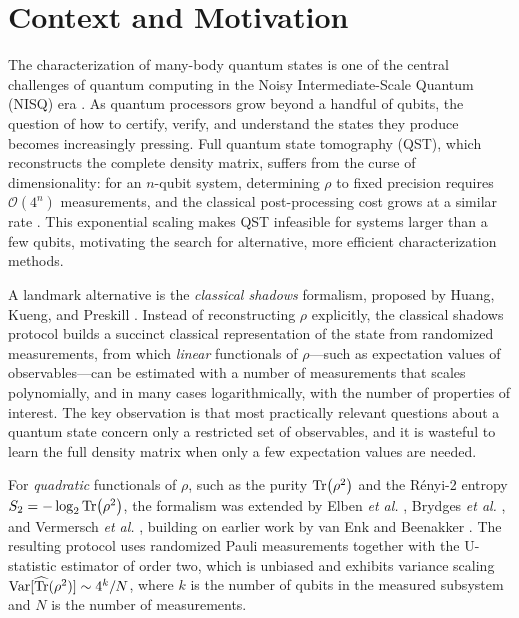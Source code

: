 \documentclass[12pt,a4paper,oneside]{book}
\theoremstyle{plain}
\theoremstyle{definition}
\theoremstyle{remark}
\DeclareMathOperator{\Var}{Var}
\begin{document}
\section{Context and Motivation}
\label{sec:context}

The characterization of many-body quantum states is one of the central challenges of quantum computing in the Noisy Intermediate-Scale Quantum (NISQ) era \cite{preskill2018quantum}. As quantum processors grow beyond a handful of qubits, the question of how to certify, verify, and understand the states they produce becomes increasingly pressing. Full quantum state tomography (QST), which reconstructs the complete density matrix, suffers from the curse of dimensionality: for an $n$-qubit system, determining $\rho$ to fixed precision requires $\mathcal{O}(4^n)$ measurements, and the classical post-processing cost grows at a similar rate \cite{gross2010compressed, nielsen2010quantum}. This exponential scaling makes QST infeasible for systems larger than a few qubits, motivating the search for alternative, more efficient characterization methods.

A landmark alternative is the \emph{classical shadows} formalism, proposed by Huang, Kueng, and Preskill \cite{huang2020predicting}. Instead of reconstructing $\rho$ explicitly, the classical shadows protocol builds a succinct classical representation of the state from randomized measurements, from which \emph{linear} functionals of $\rho$---such as expectation values of observables---can be estimated with a number of measurements that scales polynomially, and in many cases logarithmically, with the number of properties of interest. The key observation is that most practically relevant questions about a quantum state concern only a restricted set of observables, and it is wasteful to learn the full density matrix when only a few expectation values are needed.

For \emph{quadratic} functionals of $\rho$, such as the purity $\Tr(\rho^2)$ and the R\'enyi-2 entropy $S_2 = -\log_2 \Tr(\rho^2)$, the formalism was extended by Elben \textit{et al.} \cite{elben2020cross}, Brydges \textit{et al.} \cite{brydges2019probing}, and Vermersch \textit{et al.} \cite{vermersch2018statistical}, building on earlier work by van Enk and Beenakker \cite{vanenk2012measuring}. The resulting protocol uses randomized Pauli measurements together with the U-statistic estimator of order two, which is unbiased and exhibits variance scaling $\Var[\widehat{\Tr}(\rho^2)] \sim 4^k / N$, where $k$ is the number of qubits in the measured subsystem and $N$ is the number of measurements.
\end{document}
